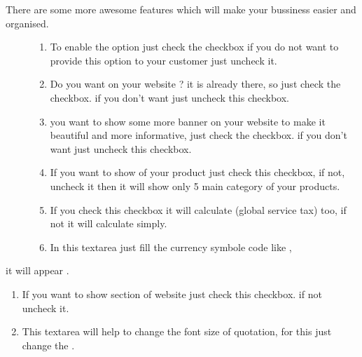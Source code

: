 \documentclass[a4paper,10pt,english]{report}
\begin{document}
\begin{figure}[htbp]
\centering

\noindent{}
\end{figure}
\begin{description}
\item[{There are some more awesome features which will make your bussiness easier and organised.}] \leavevmode\begin{enumerate}
\def\theenumi{\arabic{enumi}}
\def\labelenumi{\theenumi .}
\makeatletter\def\p@enumii{\p@enumi \theenumi .}\makeatother
\setcounter{enumi}{26}
\item {} 
To enable the  option just check the checkbox if you do not want to provide this option to your customer just uncheck it.

\item {} 
Do you want  on your website ? it is already there, so just check the checkbox. if you don’t want just uncheck this checkbox.

\item {} 
you want to show some more banner on your website to make it beautiful and more informative, just check the checkbox. if you don’t want just uncheck this checkbox.

\item {} 
If you want to show  of your product just check this checkbox, if not, uncheck it then it will show only 5 main category of your products.

\item {} 
If you check this checkbox it will calculate  (global service tax) too, if not  it will calculate simply.

\item {} 
In this textarea just fill the currency symbole code like ,

\end{enumerate}

\end{description}

it will appear .
\begin{enumerate}
\def\theenumi{\arabic{enumi}}
\def\labelenumi{\theenumi .}
\makeatletter\def\p@enumii{\p@enumi \theenumi .}\makeatother
\setcounter{enumi}{32}
\item {} 
If you want to show  section of website just check this checkbox. if not uncheck it.

\item {} 
This textarea will help to change the font size of  quotation, for this just change the .

\end{enumerate}
\end{document}
